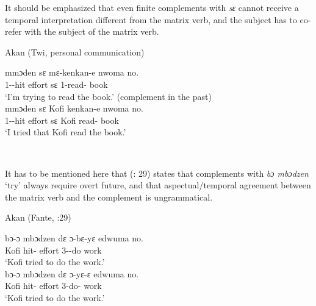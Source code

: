 \documentclass[output=paper]{langscibook}
\begin{document}
It should be emphasized that even finite complements with \textit{sɛ} cannot receive a temporal interpretation different from the matrix verb, and the subject has to co-refer with the subject of the matrix verb. 


\begin{exe}
\ex \label{Paj23} Akan (Twi, personal communication) 
\begin{xlist}

\ex \label{Paj23a} 
 {mmɔden} {s{ɛ}} {m{ɛ}-kenkan-e} {nwoma} {no. }\\
   1{\sg}--hit effort s{ɛ} 1{\sg}-read-{\compl} book \\
\glt `I'm trying to read the book.' (complement in the past) \\

\ex \label{Paj23b} 
 {mmɔden} {s{ɛ}} {Kofi} {kenkan-e} {nwoma} {no. }\\
   1{\sg}--hit effort s{ɛ} Kofi read-{\compl} book \\
\glt *‘I tried that Kofi read the book.’ \\

\end{xlist}
\end{exe}
 \

It has to be mentioned here that \citeauthor{osam1998} (\citeyear{osam1998}: 29) states that complements with \emph{bɔ mbɔdzen} `try’ always require overt future, and that aspectual/temporal agreement between the matrix verb and the complement is ungrammatical.

\begin{exe}
\ex \label{Paj24} Akan (Fante, \citealt{osam1998}:29) 
\begin{xlist}

\ex \label{Paj24a} 
 {b{ɔ}-{ɔ}} {mb{ɔ}dzen} {d{ɛ}} {{ɔ}-b{ɛ}-y{ɛ}} {edwuma} {no.}\\
  Kofi hit-{\compl} effort {\compl} 3{\sg}--do work \\
\glt `Kofi tried to do the work.'\\

\ex \label{Paj24b} 
 {b{ɔ}-{ɔ}} {mb{ɔ}dzen} {d{ɛ}} {{ɔ}-y{ɛ}-{ɛ}} {edwuma} {no.}\\
  Kofi hit-{\compl} effort {\compl} 3{\sg}-do-{\compl} work \\
\glt `Kofi tried to do the work.'\\

\end{xlist}
\end{exe}
 \
\end{document}
